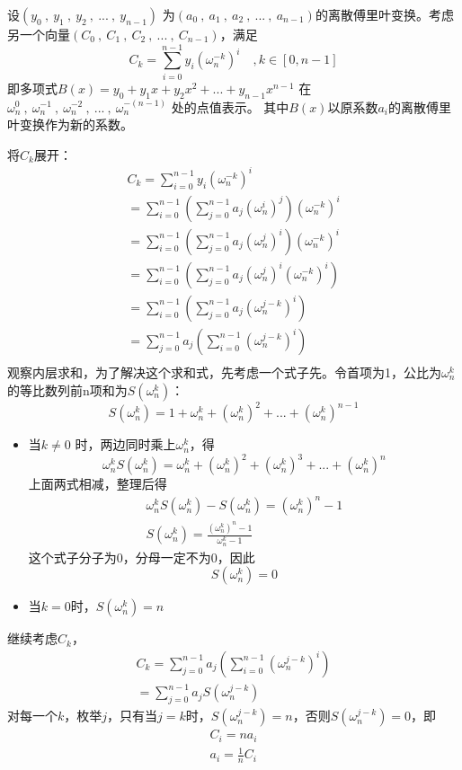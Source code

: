 设$(y_0\ ,\ y_1\ ,\ y_2\ ,\ ...\ ,\ y_{n-1})$ 为$(a_0\ ,\ a_1\ ,\ a_2\ ,\ ...\ ,\ a_{n-1})$的离散傅里叶变换。考虑另一个向量$(C_0\ ,\ C_1\ ,\ C_2\ ,\ ...\ ,\ C_{n-1})$，满足
$$
C_k=\sum_{i=0}^{n-1}y_i(\omega_n^{-k})^i   \quad,k\in [0,n-1]
$$
即多项式$B(x)=y_0+y_1x+y_2x^2+...+y_{n-1}x^{n-1}$ 在$\omega_n^0\ ,\ \omega_n^{-1}\ ,\ \omega_n^{-2}\ ,\ ...\ ,\ \omega_n^{-(n-1)}$ 处的点值表示。
其中{\heiti $B(x)$以原系数$a_i$的离散傅里叶变换作为新的系数。}

将$C_k$展开：
\begin{align*}
C_k=\sum_{i=0}^{n-1}y_i(\omega_n^{-k})^i \\
=\sum_{i=0}^{n-1} ( \sum_{j=0}^{n-1}a_j(\omega_n^i)^j )  (\omega_n^{-k})^i   \\
=\sum_{i=0}^{n-1} ( \sum_{j=0}^{n-1}a_j(\omega_n^j)^i )  (\omega_n^{-k})^i   \\
=\sum_{i=0}^{n-1} ( \sum_{j=0}^{n-1}a_j(\omega_n^j)^i (\omega_n^{-k})^i )     \\
=\sum_{i=0}^{n-1} ( \sum_{j=0}^{n-1}a_j(\omega_n^{j-k})^i  )     \\
=\sum_{j=0}^{n-1} a_j(\sum_{i=0}^{n-1}(\omega_n^{j-k})^i )      \\
\end{align*}
观察内层求和，为了解决这个求和式，先考虑一个式子先。令首项为1，公比为$\omega_n^k$的等比数列前n项和为$S(\omega_n^k)$：
$$
S(\omega_n^k)=1+\omega_n^k+(\omega_n^k)^2+...+(\omega_n^k)^{n-1}
$$
\begin{itemize}
\item 当$k\neq0$ 时，两边同时乘上$\omega_n^k$，得
$$
\omega_n^kS(\omega_n^k)=\omega_n^k+(\omega_n^k)^2+(\omega_n^k)^3+...+(\omega_n^k)^{n}
$$
上面两式相减，整理后得
\begin{align*}
\omega_n^kS(\omega_n^k)-S(\omega_n^k)=(\omega_n^k)^{n}-1 \\
S(\omega_n^k)=\frac{(\omega_n^k)^{n}-1 }{\omega_n^k-1}
\end{align*}
 这个式子分子为0，分母一定不为0，因此
$$
S(\omega_{n}^{k})=0
$$

\item 当$k=0$时，$S(\omega_{n}^{k})=n$
\end{itemize}

\vbox{}

继续考虑$C_k$，
\begin{align*}
C_k=\sum_{j=0}^{n-1} a_j(\sum_{i=0}^{n-1}(\omega_n^{j-k})^i ) \\
=\sum_{j=0}^{n-1} a_jS(\omega_{n}^{j-k})
\end{align*}
对每一个$k$，枚举$j$，只有当$j=k$时，$S(\omega_{n}^{j-k})=n$，否则$S(\omega_{n}^{j-k})=0$，即
\begin{align*}
C_i=na_i  \\
a_i=\frac{1}{n}C_i
\end{align*}

